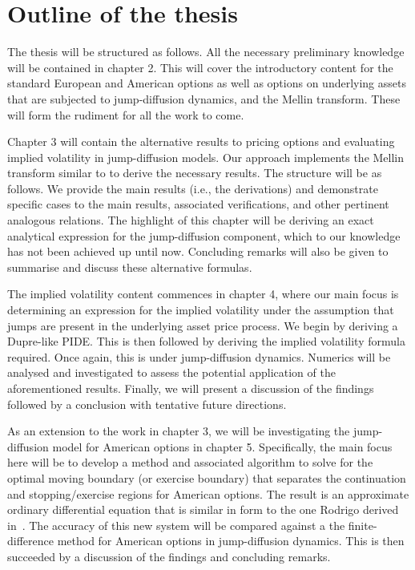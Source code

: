 		
		
		
\section{Outline of the thesis}
		The thesis will be structured as follows. All the necessary preliminary knowledge will be contained in chapter 2. This will cover the introductory content for the standard European and American options as well as options on underlying assets that are subjected to jump-diffusion dynamics, and the Mellin transform. These will form the rudiment for all the work to come. 
		
		Chapter 3 will contain the alternative results to pricing options and evaluating implied volatility in jump-diffusion models. Our approach implements the Mellin transform similar to \cite{Frontczak2013} to derive the necessary results. The structure will be as follows. We provide the main results (i.e., the derivations) and demonstrate specific cases to the main results, associated verifications, and other pertinent analogous relations. The highlight of this chapter will be deriving an exact analytical expression for the jump-diffusion component, which to our knowledge has not been achieved up until now. Concluding remarks will also be given to summarise and discuss these alternative formulas.
		 
		The implied volatility content commences in chapter 4, where our main focus is determining an expression for the implied volatility under the assumption that jumps are present in the underlying asset price process. We begin by deriving a Dupre-like PIDE. This is then followed by deriving the implied volatility formula required. Once again, this is under jump-diffusion dynamics. Numerics will be analysed and investigated to assess the potential application of the aforementioned results. Finally, we will present a discussion of the findings followed by a conclusion with tentative future directions.
		
		As an extension to the work in chapter 3, we will be investigating the jump-diffusion model for American options in chapter 5. Specifically, the main focus here will be to develop a method and associated algorithm to solve for the optimal moving boundary (or exercise boundary) that separates the continuation and stopping/exercise regions for American options. The result is an approximate ordinary differential equation that is similar in form to the one Rodrigo derived in~\cite{Rodrigo2013}. The accuracy of this new system will be compared against a the finite-difference method for American options in jump-diffusion dynamics. This is then succeeded by a discussion of the findings and concluding remarks.
		
